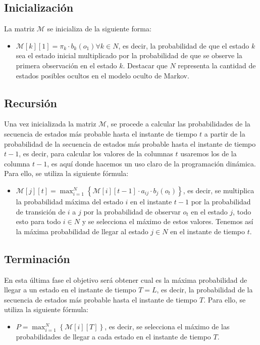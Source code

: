 \documentclass[11pt,openany]{book}
\begin{document}
\subsection{Inicialización}
La matriz $\mathscr{M}$ se inicializa de la siguiente forma:
\begin{itemize}
      \item $\mathscr{M}[k][1] = \pi_k \cdot b_k(o_1) \forall k \in N$, es decir, la probabilidad de que el estado $k$ sea el estado inicial multiplicado por la probabilidad de que se observe
      la primera observación en el estado $k$. Destacar que $N$ representa la cantidad de estados posibles ocultos en el modelo oculto de Markov.
\end{itemize}

\subsection{Recursión}
Una vez inicializada la matriz $\mathscr{M}$, se procede a calcular las probabilidades de la secuencia de estados más probable hasta el instante de tiempo $t$ a partir de la probabilidad
de la secuencia de estados más probable hasta el instante de tiempo $t-1$, es decir, para calcular los valores de la columnas $t$ usaremos los de la columna $t-1$, es aquí donde hacemos
un uso claro de la programación dinámica. Para ello, se utiliza la siguiente fórmula:
\begin{itemize}
      \item $\mathscr{M}[j][t] = \max_{i=1}^{N} \left\{ \mathscr{M}[i][t-1] \cdot a_{ij} \cdot b_j(o_t) \right\}$, es decir, se multiplica la probabilidad máxima del estado $i$ en
      el instante $t-1$ por la probabilidad de transición de $i$ a $j$ por la probabilidad de observar $o_t$ en el estado $j$, todo esto para todo $i\in N$ y se 
      selecciona el máximo de estos valores. Tenemos así la máxima probabilidad de llegar al estado $j\in N$ en el instante de tiempo $t$.
\end{itemize}
\subsection{Terminación}
En esta última fase el objetivo será obtener cual es la máxima probabilidad de llegar a un estado en el instante de tiempo $T=L$, es decir, la probabilidad de la secuencia de estados
más probable hasta el instante de tiempo $T$. Para ello, se utiliza la siguiente fórmula:
\begin{itemize}
      \item $P = \max_{i=1}^{N} \left\{ \mathscr{M}[i][T] \right\}$, es decir, se selecciona el máximo de las probabilidades de llegar a cada estado en el instante de tiempo $T$.
\end{itemize}
\end{document}
